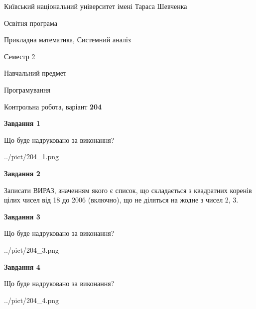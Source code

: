 \documentclass[12pt, ukrainian]{article}
\begin{document}
{{\begin {small}\par
{ \center  Київський національний університет імені Тараса Шевченка \par}
{\parbox {5 cm}{Освітня програма \hfill}{\parbox {8 cm}{Прикладна математика, Системний аналіз \hfill}}\parbox {5 cm}{\hfill Семестр 2}}\par
{\parbox {5 cm} {Навчальний предмет \hfill}\parbox {7 cm}{Програмування \hfill}\parbox {6cm}{\hfill}\par}\vspace{-7pt} \end{small}}{\center Контрольна робота, варіант  \No \textbf
{ 204 }\par}}
{
\begin {large}
{\begin {center}\textbf{Завдання 1}\end {center}}\par
Що буде надруковано за виконання?\par\par
\begin{center}
	{../pict/204_1.png}
\end{center}
\newpage

{\begin {center}\textbf{Завдання 2}\end {center}}\par

Записати ВИРАЗ, значенням якого є список, що складається з квадратних коренів цілих чисел від 18 до 2006 (включно), що не діляться на жодне з чисел 2, 3.\par
\newpage

{\begin {center}\textbf{Завдання 3}\end {center}}\par
Що буде надруковано за виконання?\par
\begin{center}
	{../pict/204_3.png}
\end{center}
\newpage

{\begin {center}\textbf{Завдання 4}\end {center}}\par
Що буде надруковано за виконання?\par
\begin{center}
	{../pict/204_4.png}
\end{center}
\newpage


\end{large}}
\end{document}
